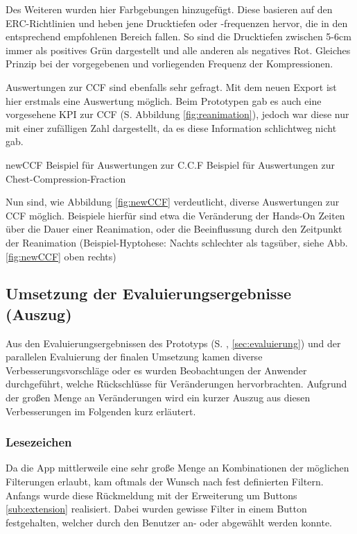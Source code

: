 Des Weiteren wurden hier Farbgebungen hinzugefügt.
Diese basieren auf den ERC-Richtlinien \cite{Adams.2016, Monsieurs.2015} und heben jene Drucktiefen oder -frequenzen hervor, die in den entsprechend empfohlenen Bereich fallen.
So sind die Drucktiefen zwischen 5-6cm immer als positives Grün dargestellt und alle anderen als negatives Rot.
Gleiches Prinzip bei der vorgegebenen und vorliegenden Frequenz der Kompressionen.

Auswertungen zur \gls{CCF} sind ebenfalls sehr gefragt.
Mit dem neuen Export ist hier erstmals eine Auswertung möglich. 
Beim Prototypen gab es auch eine vorgesehene \gls{KPI} zur CCF (S.\pageref{fig:reanimation} Abbildung \ref{fig:reanimation}), jedoch war diese nur mit einer zufälligen Zahl dargestellt, da es diese Information schlichtweg nicht gab.

\bildbreit
{newCCF}
{Beispiel für Auswertungen zur \gls{C.C.F}}
{Beispiel für Auswertungen zur Chest-Compression-Fraction}

Nun sind, wie Abbildung \ref{fig:newCCF} verdeutlicht, diverse Auswertungen zur CCF möglich.
Beispiele hierfür sind etwa die Veränderung der Hands-On Zeiten über die Dauer einer Reanimation, oder die Beeinflussung durch den Zeitpunkt der Reanimation (Beispiel-Hyptohese: Nachts schlechter als tagsüber, siehe Abb. \ref{fig:newCCF} oben rechts)

\subsection{Umsetzung der Evaluierungsergebnisse (Auszug)}
Aus den Evaluierungsergebnissen des Prototyps (S. \pageref{sec:evaluierung}, \ref{sec:evaluierung}) und der parallelen Evaluierung der finalen Umsetzung kamen diverse Verbesserungsvorschläge oder es wurden Beobachtungen der Anwender durchgeführt, welche Rückschlüsse für Veränderungen hervorbrachten.
Aufgrund der großen Menge an Veränderungen wird ein kurzer Auszug aus diesen Verbesserungen im Folgenden kurz erläutert.

\subsubsection{Lesezeichen} %
\label{subsub:lesezeichen}
Da die App mittlerweile eine sehr große Menge an Kombinationen der möglichen Filterungen erlaubt, kam oftmals der Wunsch nach fest definierten Filtern.
Anfangs wurde diese Rückmeldung mit der Erweiterung um Buttons \ref{sub:extension} realisiert.
Dabei wurden gewisse Filter in einem Button festgehalten, welcher durch den Benutzer an- oder abgewählt werden konnte.

